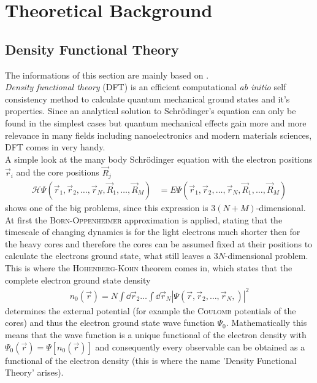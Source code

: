 \section{Theoretical Background}

\subsection{Density Functional Theory}
The informations of this section are mainly based on \cite{KOSKINEN2009237,1402-4896-2004-T109-001}.\\
\emph{Density functional theory} (DFT) is an efficient computational \emph{ab initio} self consistency method to calculate quantum mechanical ground states and it's properties. Since an analytical solution to Schrödinger's equation can only be found in the simplest cases but quantum mechanical effects gain more and more relevance in many fields including nanoelectronics and modern materials sciences, DFT comes in very handy.\\
A simple look at the many body Schrödinger equation with the electron positions $\vec{r}_i$ and the core positions $\vec{R}_j$
\begin{align}
	\mathcal{H} \Psi\left(\vec{r}_1,\vec{r}_2,\dots,\vec{r}_N,\vec{R}_1,\dots,\vec{R}_M\right) &= E \Psi\left(\vec{r}_1,\vec{r}_2,\dots,\vec{r}_N,\vec{R}_1,\dots,\vec{R}_M\right)
\end{align}
shows one of the big problems, since this expression is $3(N+M)$-dimensional.
At first the \textsc{Born-Oppenheimer} approximation is applied, stating that the timescale of changing dynamics is for the light electrons much shorter then for the heavy cores and therefore the cores can be assumed fixed at their positions to calculate the electrons ground state, what still leaves a $3N$-dimensional problem.\\
This is where the \textsc{Hohenberg-Kohn} theorem comes in, which states that the complete electron ground state density
\begin{align}
n_0\left(\vec{r}\right) = N\int\dd\vec{r}_2\dots\int\dd\vec{r}_N\left|\Psi\left(\vec{r}, \vec{r}_2, \dots,\vec{r}_N,\right)\right|^2
\end{align}
determines the external potential (for example the \textsc{Coulomb} potentials of the cores) and thus the electron ground state wave function $\Psi_0$. Mathematically this means that the wave function is a unique functional of the electron density with $\Psi_0\left(\vec{r}\right) = \Psi\left[n_0\left(\vec{r}\right)\right]$ and consequently every observable can be obtained as a functional of the electron density (this is where the name 'Density Functional Theory' arises).\\
